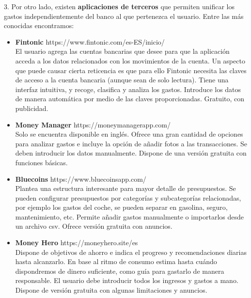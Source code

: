 3. Por otro lado, existen \textbf{aplicaciones de terceros} que permiten unificar los gastos 
independientemente del banco al que pertenezca el usuario. Entre las más conocidas 
encontramos:

\begin{itemize}
    \item \textbf{Fintonic} https://www.fintonic.com/es-ES/inicio/ \\
    El usuario agrega las cuentas bancarias que desee para que la aplicación 
    acceda a los datos relacionados con los movimientos de la cuenta. 
    Un aspecto que puede causar cierta reticencia es que para ello Fintonic necesita
    las claves de acceso a la cuenta bancaria (aunque sean de solo lectura).
    Tiene una interfaz intuitiva, y recoge, clasifica y analiza los gastos.
    Introduce los datos de manera automática por medio de las claves proporcionadas. 
    Gratuito, con publicidad.

    \item \textbf{Money Manager}  https://moneymanagerapp.com/ \\
    Solo se encuentra disponible en inglés. Ofrece una gran cantidad de opciones
    para analizar gastos e incluye la opción de añadir fotos a las transacciones. 
    Se deben introducir los datos manualmente. 
    Dispone de una versión gratuita con funciones básicas.

    \item \textbf{Bluecoins} https://www.bluecoinsapp.com/ \\
    Plantea una estructura interesante para mayor detalle de presupuestos. 
    Se pueden configurar presupuestos por categorías y subcategorías relacionadas, por ejemplo 
    los gastos del coche, se pueden separar en gasolina, seguro, mantenimiento, etc. 
    Permite añadir gastos manualmente o importarlos desde un archivo csv. 
    Ofrece versión gratuita con anuncios.

    \item \textbf{Money Hero} https://moneyhero.site/es  \\
    Dispone de objetivos de ahorro e indica el progreso y recomendaciones 
    diarias hasta alcanzarlo. 
    En base al ritmo de consumo estima hasta cuándo dispondremos 
    de dinero suficiente, como guía para gastarlo de manera responsable. 
    El usuario debe introducir todos los ingresos y gastos a mano. 
    Dispone de versión gratuita con algunas limitaciones y anuncios.
\end{itemize}

